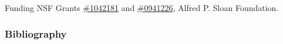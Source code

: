 

%

\begin{frame}
\begin{block}{Funding}
 NSF Grants 
\href{http://www.nsf.gov/awardsearch/showAward.do?AwardNumber=1042181}{\#1042181} 
and 
\href{http://www.nsf.gov/awardsearch/showAward.do?AwardNumber=0941226}{\#0941226},  Alfred P. Sloan Foundation.

\end{block}
\end{frame}

\begin{frame}
\frametitle{Bibliography}
\tiny
%
	

%
%

\end{frame}


%
